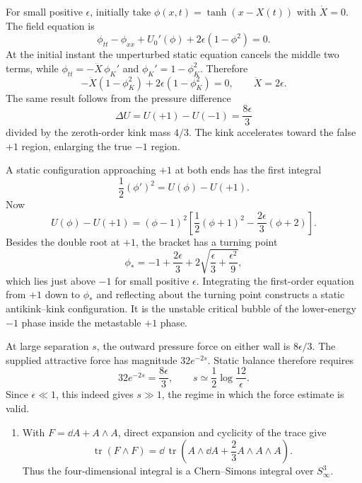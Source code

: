 \begin{enumerate}
  For small positive \(\epsilon\), initially take
  \(\phi(x,t)=\tanh(x-X(t))\) with \(\dot X=0\).  The field equation is
  \[
    \phi_{tt}-\phi_{xx}+U_0'(\phi)
      +2\epsilon(1-\phi^2)=0.
  \]
  At the initial instant the unperturbed static equation cancels the
  middle two terms, while
  \(\phi_{tt}=-\ddot X\,\phi_K'\) and
  \(\phi_K'=1-\phi_K^2\).  Therefore
  \[
    -\ddot X(1-\phi_K^2)
      +2\epsilon(1-\phi_K^2)=0,
    \qquad
    \boxed{\ddot X=2\epsilon.}
  \]
  The same result follows from the pressure difference
  \[
    \Delta U=U(+1)-U(-1)=\frac{8\epsilon}{3}
  \]
  divided by the zeroth-order kink mass \(4/3\).  The kink accelerates
  toward the false \(+1\) region, enlarging the true \(-1\) region.

  A static configuration approaching \(+1\) at both ends has the first
  integral
  \[
    \frac12(\phi')^2=U(\phi)-U(+1).
  \]
  Now
  \[
    U(\phi)-U(+1)
      =(\phi-1)^2\left[
        \frac12(\phi+1)^2-\frac{2\epsilon}{3}(\phi+2)\right].
  \]
  Besides the double root at \(+1\), the bracket has a turning point
  \[
    \phi_*=-1+\frac{2\epsilon}{3}
      +2\sqrt{\frac{\epsilon}{3}+\frac{\epsilon^2}{9}},
  \]
  which lies just above \(-1\) for small positive \(\epsilon\).
  Integrating the first-order equation from \(+1\) down to \(\phi_*\)
  and reflecting about the turning point constructs a static
  antikink--kink configuration.  It is the unstable critical bubble of
  the lower-energy \(-1\) phase inside the metastable \(+1\) phase.

  At large separation \(s\), the outward pressure force on either wall is
  \(8\epsilon/3\).  The supplied attractive force has magnitude
  \(32e^{-2s}\).  Static balance therefore requires
  \[
    32e^{-2s}=\frac{8\epsilon}{3},
    \qquad
    \boxed{s\simeq\frac12\log\frac{12}{\epsilon}.}
  \]
  Since \(\epsilon\ll1\), this indeed gives \(s\gg1\), the regime in
  which the force estimate is valid.

  \begin{enumerate}
    \item[(a)]
    With \(F=\dd A+A\wedge A\), direct expansion and cyclicity of the trace
    give
    \[
      \operatorname{tr}(F\wedge F)
        =\dd\,\operatorname{tr}\left(
          A\wedge \dd A+\frac23A\wedge A\wedge A\right).
    \]
    Thus the four-dimensional integral is a Chern--Simons integral over
    \(S^3_\infty\).


\end{enumerate}
\end{enumerate}
